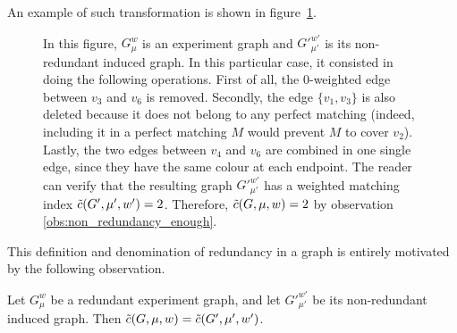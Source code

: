 An example of such transformation is shown in figure~\ref{fig:non_redundant_induced_graph}.

\begin{figure}[H]
    \caption{In this figure, $G_\mu^w$ is an experiment graph and ${G'}_{\mu'}^{w'}$ is its non-redundant induced graph. In this particular case, it consisted in doing the following operations. First of all, the $0$-weighted edge between $v_3$ and $v_6$ is removed. Secondly, the edge $\{v_1, v_3\}$ is also deleted because it does not belong to any perfect matching (indeed, including it in a perfect matching $M$ would prevent $M$ to cover $v_2$). Lastly, the two edges between $v_4$ and $v_6$ are combined in one single edge, since they have the same colour at each endpoint. The reader can verify that the resulting graph ${G'}_{\mu'}^{w'}$ has a weighted matching index $\Tilde{c}(G', \mu', w') = 2$. Therefore, $\Tilde{c}(G, \mu, w) = 2$ by observation \ref{obs:non_redundancy_enough}.}
    \label{fig:non_redundant_induced_graph}
\end{figure}

This definition and denomination of redundancy in a graph is entirely motivated by the following observation.

\begin{observation}
    \label{obs:non_redundancy_enough}
    Let $G_\mu^w$ be a redundant experiment graph, and let ${G'}_{\mu'}^{w'}$ be its non-redundant induced graph.
    Then $\Tilde{c}(G, \mu, w) = \Tilde{c}(G', \mu', w')$.
\end{observation}

